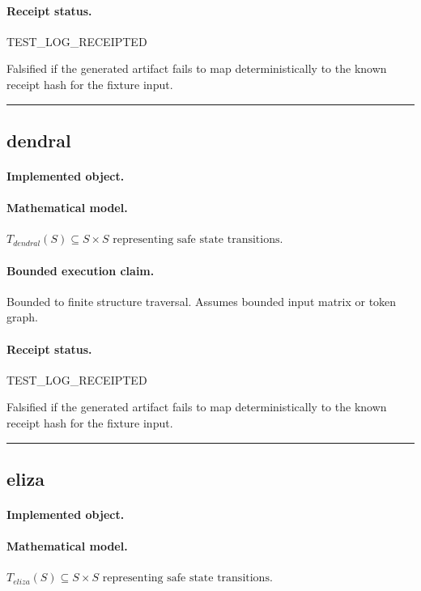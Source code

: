 \paragraph{Receipt status.} TEST\_LOG\_RECEIPTED
\begin{falsifier}
Falsified if the generated artifact fails to map deterministically to the known receipt hash for the fixture input.
\end{falsifier}

\vspace{1em}\hrule\vspace{1em}
\subsection{dendral}
\paragraph{Implemented object.} 
\paragraph{Mathematical model.} $T_{dendral}(S) \subseteq S \times S \text{ representing safe state transitions}.$
\paragraph{Bounded execution claim.} Bounded to finite structure traversal. Assumes bounded input matrix or token graph.
\paragraph{Receipt status.} TEST\_LOG\_RECEIPTED
\begin{falsifier}
Falsified if the generated artifact fails to map deterministically to the known receipt hash for the fixture input.
\end{falsifier}

\vspace{1em}\hrule\vspace{1em}
\subsection{eliza}
\paragraph{Implemented object.} 
\paragraph{Mathematical model.} $T_{eliza}(S) \subseteq S \times S \text{ representing safe state transitions}.$
